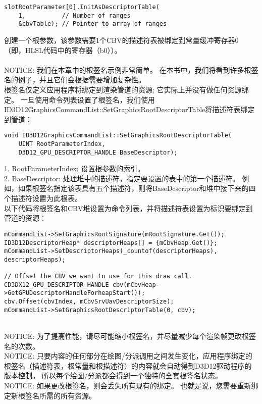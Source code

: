 \begin{flushleft}
\begin{lstlisting}
slotRootParameter[0].InitAsDescriptorTable(
    1,          // Number of ranges
    &cbvTable); // Pointer to array of ranges
\end{lstlisting}
创建一个根参数，该参数需要1个CBV的描述符表被绑定到常量缓冲寄存器0（即，HLSL代码中的寄存器（b0））。\\
~\\
NOTICE: 我们在本章中的根签名示例非常简单。 在本书中，我们将看到许多根签名的例子，并且它们会根据需要增加复杂性。
~\\
根签名仅定义应用程序将绑定到渲染管道的资源; 它实际上并没有做任何资源绑定。 一旦使用命令列表设置了根签名，我们使用ID3D12GraphicsCommandList::SetGraphicsRootDescriptorTable将描述符表绑定到管道：\\
\begin{lstlisting}
void ID3D12GraphicsCommandList::SetGraphicsRootDescriptorTable(
    UINT RootParameterIndex,
    D3D12_GPU_DESCRIPTOR_HANDLE BaseDescriptor);
\end{lstlisting}
1. RootParameterIndex: 设置根参数的索引。\\
2. BaseDescriptor: 处理堆中的描述符，指定要设置的表中的第一个描述符。 例如，如果根签名指定该表具有五个描述符，则将BaseDescriptor和堆中接下来的四个描述符设置为此根表。\\
以下代码将根签名和CBV堆设置为命令列表，并将描述符表设置为标识要绑定到管道的资源：\\
\begin{lstlisting}
mCommandList->SetGraphicsRootSignature(mRootSignature.Get());
ID3D12DescriptorHeap* descriptorHeaps[] = {mCbvHeap.Get()};
mCommandList->SetDescriptorHeaps(_countof(descriptorHeaps), descriptorHeaps);

// Offset the CBV we want to use for this draw call.
CD3DX12_GPU_DESCRIPTOR_HANDLE cbv(mCbvHeap->GetGPUDescriptorHandleForheapStart());
cbv.Offset(cbvIndex, mCbvSrvUavDescriptorSize);
mCommandList->SetGraphicsRootDescriptorTable(0, cbv);
\end{lstlisting}
~\\
NOTICE: 为了提高性能，请尽可能缩小根签名，并尽量减少每个渲染帧更改根签名的次数。\\
NOTICE: 只要内容的任何部分在绘图/分派调用之间发生变化，应用程序绑定的根签名（描述符表，根常量和根描述符）的内容就会自动得到D3D12驱动程序的版本控制。 所以每个绘图/分派都会得到一个独特的全套根签名状态。\\
NOTICE: 如果更改根签名，则会丢失所有现有的绑定。 也就是说，您需要重新绑定新根签名所需的所有资源。
\end{flushleft}


